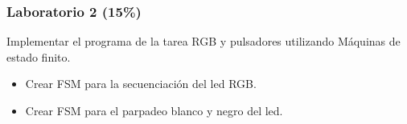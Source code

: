 \documentclass[10.5pt,scale=1.0,t,aspectratio=169,hyperref={pdfpagelabels=false}]{beamer}
\begin{document}
\begin{frame}
\frametitle{Laboratorio 2 (15\%)}

Implementar el programa de la tarea RGB y pulsadores utilizando Máquinas de estado finito. 

\begin{itemize}
	\item Crear FSM para la secuenciación del led RGB.
	\item Crear FSM para el parpadeo blanco y negro del led.
\end{itemize}

\end{frame}
\frame{
\begin{center}
	\LARGE \textcolor{blue}{CONCURRENCIA BÁSICA}
\end{center}

\begin{center}
	\LARGE \textcolor{blue}{GRACIAS}
\end{center}
}

\end{document}
